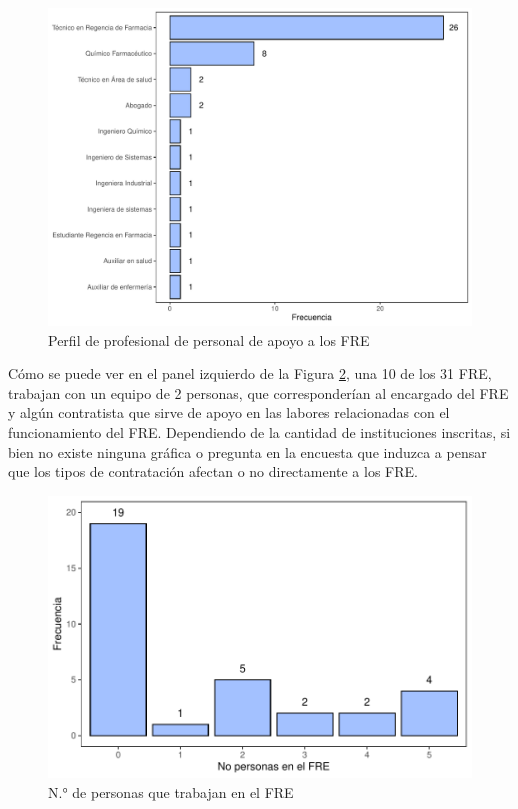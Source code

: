 \documentclass[
]{book}
\begin{document}
\begin{figure}
\includegraphics[width=0.9\linewidth]{InformeFinal_files/figure-latex/perfilProfesional2-1} \caption{Perfil de profesional de personal de apoyo a los FRE}\label{fig:perfilProfesional2}
\end{figure}

Cómo se puede ver en el panel izquierdo de la Figura \ref{fig:perfilProfesional3}, una 10 de los 31 FRE, trabajan con un equipo de 2 personas, que corresponderían al encargado del FRE y algún contratista que sirve de apoyo en las labores relacionadas con el funcionamiento del FRE. Dependiendo de la cantidad de instituciones inscritas, si bien no existe ninguna gráfica o pregunta en la encuesta que induzca a pensar que los tipos de contratación afectan o no directamente a los FRE.

\begin{figure}
\includegraphics[width=1\linewidth]{InformeFinal_files/figure-latex/perfilProfesional3-1} \caption{N.° de personas que trabajan en el FRE}\label{fig:perfilProfesional3}
\end{figure}
\end{document}
